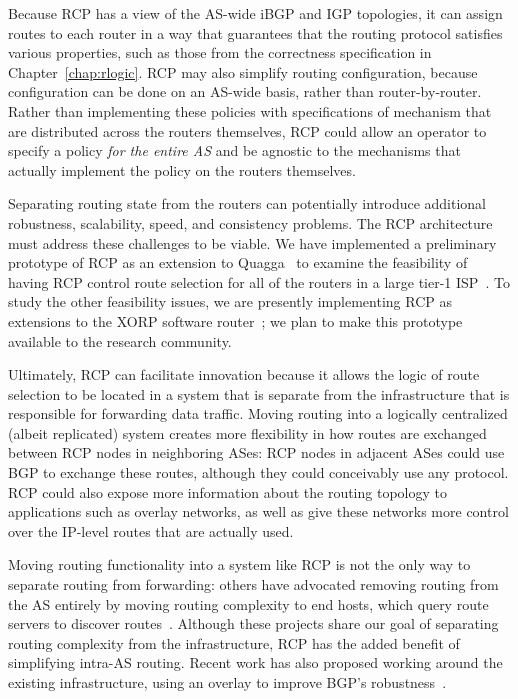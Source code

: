 Because RCP has a view of the AS-wide iBGP and IGP topologies, it can
assign routes to each router in a way that guarantees that the routing
protocol satisfies various properties, such as those from the
correctness specification in Chapter~\ref{chap:rlogic}.  RCP may also
simplify routing configuration, because configuration can be done on an
AS-wide basis, rather than router-by-router.  Rather than implementing
these policies with specifications of mechanism that are distributed
across the routers themselves, RCP could allow an operator to specify a
policy {\em for the entire AS} and be agnostic to the mechanisms that
actually implement the policy on the routers themselves.  

Separating routing state from the routers can potentially introduce
additional robustness, scalability, speed, and consistency problems.  The RCP
architecture must address these challenges to be viable.  We have implemented
a preliminary prototype of RCP as an 
extension to Quagga~\cite{www-quagga} to examine the feasibility of
having RCP control route selection for all of the routers in a large
tier-1 ISP~\cite{caesar2004}.  To study the other feasibility issues, we
are presently implementing RCP as extensions to the XORP software
router~\cite{Handley2002}; we plan to make this prototype available to
the research community.

%
%
%
%
%
%

Ultimately, RCP can facilitate innovation because it allows the logic of
route selection to be located in a system that is separate from the
infrastructure that is responsible for forwarding data traffic.  Moving
routing into a logically centralized (albeit replicated) system creates
more flexibility in how routes are exchanged between RCP nodes in
neighboring ASes: RCP nodes in adjacent ASes could use BGP to exchange
these routes, 
although they could conceivably use any protocol.  RCP could also expose
more information about the routing topology to applications such as
overlay networks, as well as give these networks more control over the
IP-level routes that are actually used.

Moving routing functionality into a system like RCP is not the only way
to separate routing from forwarding: others have advocated removing
routing from the AS entirely by moving routing complexity to end hosts,
which query route servers to discover routes~\cite{Lakshminarayanan2004,
Yang2003}.  Although these projects share our goal of separating routing
complexity from the infrastructure, RCP has the added benefit of
simplifying intra-AS routing.  Recent work has also proposed working
around the existing infrastructure, using an overlay to improve BGP's
robustness~\cite{Agarwal2003, Goodell2003}.


